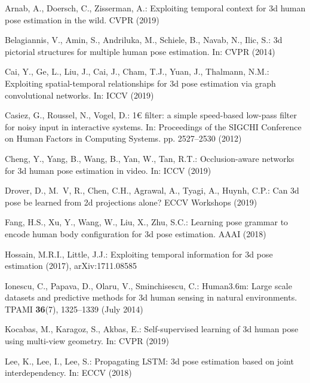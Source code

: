 \documentclass[runningheads, envcountsame, a4paper]{llncs}
\begin{document}
\begin{thebibliography}{10}
\providecommand{\url}[1]{\texttt{#1}}
\providecommand{\urlprefix}{URL }
\providecommand{\doi}[1]{https://doi.org/#1}

Arnab, A., Doersch, C., Zisserman, A.: Exploiting temporal context for 3d human
  pose estimation in the wild. CVPR  (2019)

{Belagiannis}, V., {Amin}, S., {Andriluka}, M., {Schiele}, B., {Navab}, N.,
  {Ilic}, S.: 3d pictorial structures for multiple human pose estimation. In:
  CVPR (2014)

Cai, Y., Ge, L., Liu, J., Cai, J., Cham, T.J., Yuan, J., Thalmann, N.M.:
  Exploiting spatial-temporal relationships for 3d pose estimation via graph
  convolutional networks. In: ICCV (2019)

Casiez, G., Roussel, N., Vogel, D.: 1\euro{} filter: a simple speed-based
  low-pass filter for noisy input in interactive systems. In: Proceedings of
  the SIGCHI Conference on Human Factors in Computing Systems. pp. 2527--2530
  (2012)

Cheng, Y., Yang, B., Wang, B., Yan, W., Tan, R.T.: Occlusion-aware networks for
  3d human pose estimation in video. In: ICCV (2019)

Drover, D., M.~V, R., Chen, C.H., Agrawal, A., Tyagi, A., Huynh, C.P.: Can 3d
  pose be learned from 2d projections alone? ECCV Workshops  (2019)

Fang, H.S., Xu, Y., Wang, W., Liu, X., Zhu, S.C.: Learning pose grammar to
  encode human body configuration for 3d pose estimation. AAAI  (2018)

Hossain, M.R.I., Little, J.J.: Exploiting temporal information for 3d pose
  estimation (2017), arXiv:1711.08585

Ionescu, C., Papava, D., Olaru, V., Sminchisescu, C.: Human3.6m: Large scale
  datasets and predictive methods for 3d human sensing in natural environments.
  TPAMI  \textbf{36}(7),  1325--1339 (July 2014)

Kocabas, M., Karagoz, S., Akbas, E.: Self-supervised learning of 3d human pose
  using multi-view geometry. In: CVPR (2019)

Lee, K., Lee, I., Lee, S.: Propagating {LSTM}: 3d pose estimation based on
  joint interdependency. In: ECCV (2018)


\end{thebibliography}
\end{document}
